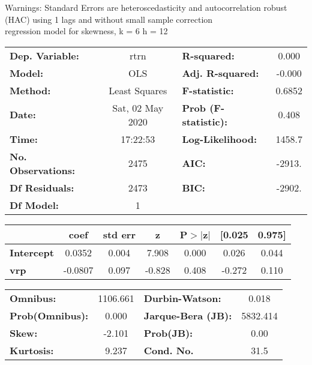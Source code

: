 Warnings: \newline
 [1] Standard Errors are heteroscedasticity and autocorrelation robust (HAC) using 1 lags and without small sample correction\\ 

regression model for skewness, k = 6 h = 12\begin{center}
\begin{tabular}{lclc}
\toprule
\textbf{Dep. Variable:}    &       rtrn       & \textbf{  R-squared:         } &     0.000   \\
\textbf{Model:}            &       OLS        & \textbf{  Adj. R-squared:    } &    -0.000   \\
\textbf{Method:}           &  Least Squares   & \textbf{  F-statistic:       } &    0.6852   \\
\textbf{Date:}             & Sat, 02 May 2020 & \textbf{  Prob (F-statistic):} &    0.408    \\
\textbf{Time:}             &     17:22:53     & \textbf{  Log-Likelihood:    } &    1458.7   \\
\textbf{No. Observations:} &        2475      & \textbf{  AIC:               } &    -2913.   \\
\textbf{Df Residuals:}     &        2473      & \textbf{  BIC:               } &    -2902.   \\
\textbf{Df Model:}         &           1      & \textbf{                     } &             \\
\bottomrule
\end{tabular}
\begin{tabular}{lcccccc}
                   & \textbf{coef} & \textbf{std err} & \textbf{z} & \textbf{P$> |$z$|$} & \textbf{[0.025} & \textbf{0.975]}  \\
\midrule
\textbf{Intercept} &       0.0352  &        0.004     &     7.908  &         0.000        &        0.026    &        0.044     \\
\textbf{vrp}       &      -0.0807  &        0.097     &    -0.828  &         0.408        &       -0.272    &        0.110     \\
\bottomrule
\end{tabular}
\begin{tabular}{lclc}
\textbf{Omnibus:}       & 1106.661 & \textbf{  Durbin-Watson:     } &    0.018  \\
\textbf{Prob(Omnibus):} &   0.000  & \textbf{  Jarque-Bera (JB):  } & 5832.414  \\
\textbf{Skew:}          &  -2.101  & \textbf{  Prob(JB):          } &     0.00  \\
\textbf{Kurtosis:}      &   9.237  & \textbf{  Cond. No.          } &     31.5  \\
\bottomrule
\end{tabular}
\end{center}

